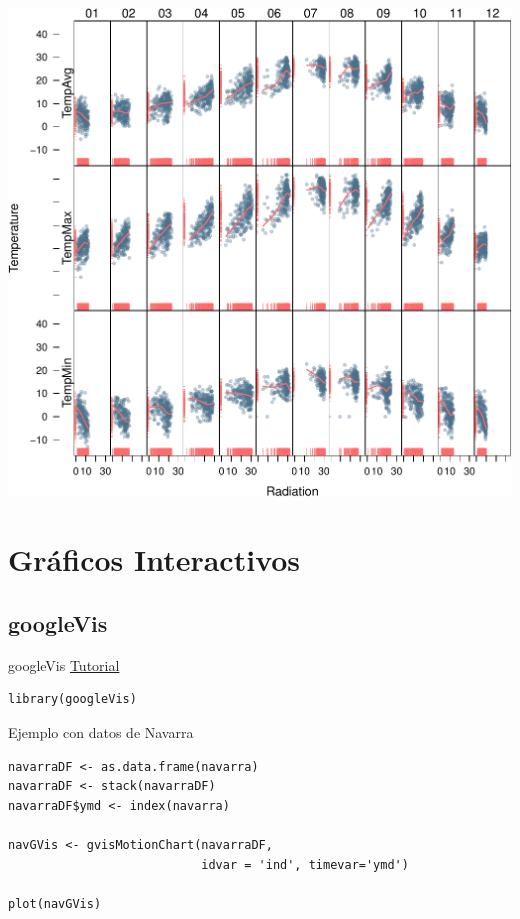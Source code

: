 \documentclass[xcolor={usenames,svgnames,dvipsnames}]{beamer}
\begin{document}
\begin{frame}[label=sec-4-2-5]{}
\includegraphics[width=.9\linewidth]{figs/aranjuezOuterStrips.pdf}
\end{frame}


\section{Gráficos Interactivos}
\label{sec-5}
\subsection{googleVis}
\label{sec-5-1}

\begin{frame}[fragile,label=sec-5-1-1]{googleVis}
 \href{http://decastillo.github.io/googleVis_Tutorial/}{Tutorial}

\lstset{language=R,label= ,caption= ,numbers=none}
\begin{lstlisting}
library(googleVis)
\end{lstlisting}
\end{frame}

\begin{frame}[fragile,label=sec-5-1-2]{Ejemplo con datos de Navarra}
 \lstset{language=R,label= ,caption= ,numbers=none}
\begin{lstlisting}
navarraDF <- as.data.frame(navarra)
navarraDF <- stack(navarraDF)
navarraDF$ymd <- index(navarra)

navGVis <- gvisMotionChart(navarraDF,
                           idvar = 'ind', timevar='ymd')

plot(navGVis)
\end{lstlisting}
\end{frame}
\end{document}
